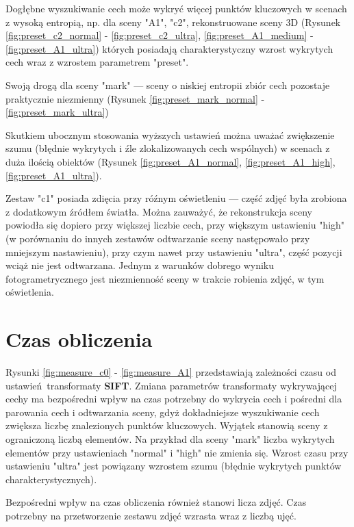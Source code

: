 Dogłębne wyszukiwanie cech może wykryć więcej punktów kluczowych w scenach z wysoką entropią, np. dla sceny "A1", "c2", rekonstruowane sceny 3D (Rysunek \ref{fig:preset_c2_normal} - \ref{fig:preset_c2_ultra}, \ref{fig:preset_A1_medium} -  \ref{fig:preset_A1_ultra}) których posiadają charakterystyczny wzrost wykrytych cech wraz z wzrostem parametrem "preset".


Swoją drogą dla sceny "mark" --- sceny o niskiej entropii zbiór cech pozostaje praktycznie niezmienny (Rysunek \ref{fig:preset_mark_normal} - \ref{fig:preset_mark_ultra})


Skutkiem ubocznym stosowania wyższych ustawień można uważać zwiększenie szumu (błędnie wykrytych i źle zlokalizowanych cech wspólnych) w scenach z duża ilością obiektów (Rysunek \ref{fig:preset_A1_normal}, \ref{fig:preset_A1_high}, \ref{fig:preset_A1_ultra}).

Zestaw "c1" posiada zdięcia przy róźnym oświetleniu --- część zdjęć była zrobiona z dodatkowym źródłem światła.
Można zauważyć, że rekonstrukcja sceny powiodła się dopiero przy większej liczbie cech, przy większym ustawieniu "high" (w porównaniu do innych zestawów odtwarzanie sceny następowało przy mniejszym nastawieniu), przy czym nawet przy ustawieniu "ultra", część pozycji wciąż nie jest odtwarzana.
Jednym z warunków dobrego wyniku fotogrametrycznego jest niezmienność sceny w trakcie robienia zdjęć, w tym oświetlenia.

\section{Czas obliczenia}

Rysunki \ref{fig:measure_c0} - \ref{fig:measure_A1} przedstawiają zależności czasu od ustawień transformaty \textbf{SIFT}.
Zmiana parametrów transformaty wykrywającej cechy ma bezpośredni wpływ na czas potrzebny do wykrycia cech i pośredni dla parowania cech i odtwarzania sceny, gdyż dokładniejsze wyszukiwanie cech zwiększa liczbę znalezionych punktów kluczowych.
Wyjątek stanowią sceny z ograniczoną liczbą elementów.
Na przykład dla sceny "mark" liczba wykrytych elementów przy ustawieniach "normal" i "high" nie zmienia się. Wzrost czasu przy ustawieniu "ultra" jest powiązany wzrostem szumu (błędnie wykrytych punktów charakterystycznych).

Bezpośredni wpływ na czas obliczenia również stanowi licza zdjęć.
Czas potrzebny na przetworzenie zestawu zdjęć wzrasta wraz z liczbą ujęć.

